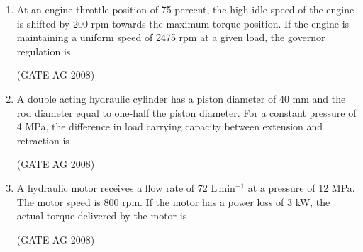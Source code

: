 \documentclass[journal]{IEEEtran}
\begin{document}
\begin{enumerate}
\medskip

\item 
 At an engine throttle position of 75 percent, the high idle speed of the engine is shifted by 200 rpm towards the maximum torque position. If the engine is maintaining a uniform speed of 2475 rpm at a given load, the governor regulation is
\begin{enumerate}
\end{enumerate}
\hfill(GATE AG 2008)\\

\medskip

\item 
 A double acting hydraulic cylinder has a piston diameter of 40 mm and the rod diameter equal to one-half the piston diameter. For a constant pressure of 4 MPa, the difference in load carrying capacity between extension and retraction is
\begin{enumerate}
\end{enumerate}
\hfill(GATE AG 2008)\\

\medskip

\item 
 A hydraulic motor receives a flow rate of 72 L\,min$^{-1}$ at a pressure of 12 MPa. The motor speed is 800 rpm. If the motor has a power loss of 3 kW, the actual torque delivered by the motor is
\begin{enumerate}
\end{enumerate}
\hfill(GATE AG 2008)\\


\end{enumerate}
\end{document}
